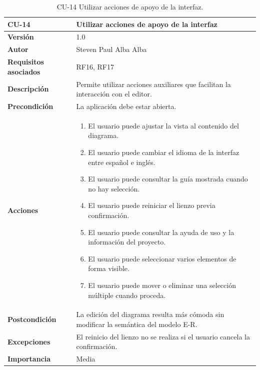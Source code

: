 \begin{table}[p]
\centering
\begin{tabularx}{\linewidth}{ p{} p{} }
\toprule
\textbf{CU-14} & \textbf{Utilizar acciones de apoyo de la interfaz}\\
\toprule
\textbf{Versión} & 1.0 \\
\textbf{Autor} & Steven Paul Alba Alba \\
\textbf{Requisitos asociados} & RF16, RF17 \\
\textbf{Descripción} & Permite utilizar acciones auxiliares que facilitan la interacción con el editor. \\
\textbf{Precondición} & La aplicación debe estar abierta. \\
\textbf{Acciones} &
\begin{enumerate}
\def\labelenumi{\arabic{enumi}.}
\tightlist
\item El usuario puede ajustar la vista al contenido del diagrama.
\item El usuario puede cambiar el idioma de la interfaz entre español e inglés.
\item El usuario puede consultar la guía mostrada cuando no hay selección.
\item El usuario puede reiniciar el lienzo previa confirmación.
\item El usuario puede consultar la ayuda de uso y la información del proyecto.
\item El usuario puede seleccionar varios elementos de forma visible.
\item El usuario puede mover o eliminar una selección múltiple cuando proceda.
\end{enumerate}\\
\textbf{Postcondición} & La edición del diagrama resulta más cómoda sin modificar la semántica del modelo E-R. \\
\textbf{Excepciones} & El reinicio del lienzo no se realiza si el usuario cancela la confirmación. \\
\textbf{Importancia} & Media \\
\bottomrule
\end{tabularx}
\caption{CU-14 Utilizar acciones de apoyo de la interfaz.}
\end{table}
